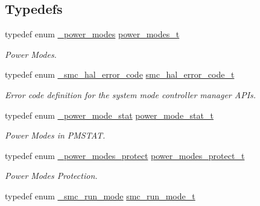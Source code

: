 \subsection*{Typedefs}
\begin{DoxyCompactItemize}
\item 
typedef enum \hyperlink{group__smc__hal_gadd864c409720de3fed5b226fa10e0b2d}{\+\_\+power\+\_\+modes} \hyperlink{group__smc__hal_gaabb544d3244b2616aba0a5dca3e18341}{power\+\_\+modes\+\_\+t}\hypertarget{group__smc__hal_gaabb544d3244b2616aba0a5dca3e18341}{}\label{group__smc__hal_gaabb544d3244b2616aba0a5dca3e18341}

\begin{DoxyCompactList}\small\item\em Power Modes. \end{DoxyCompactList}\item 
typedef enum \hyperlink{group__smc__hal_gaa517032576fb0e6693a224db2910fdda}{\+\_\+smc\+\_\+hal\+\_\+error\+\_\+code} \hyperlink{group__smc__hal_ga2b751667d499e320a58e84ac74abad59}{smc\+\_\+hal\+\_\+error\+\_\+code\+\_\+t}\hypertarget{group__smc__hal_ga2b751667d499e320a58e84ac74abad59}{}\label{group__smc__hal_ga2b751667d499e320a58e84ac74abad59}

\begin{DoxyCompactList}\small\item\em Error code definition for the system mode controller manager A\+P\+Is. \end{DoxyCompactList}\item 
typedef enum \hyperlink{group__smc__hal_ga50d35fdd2a2912b96e155d3f0dd395a4}{\+\_\+power\+\_\+mode\+\_\+stat} \hyperlink{group__smc__hal_ga6a75e966ec5d87b8c6a81d89eca06196}{power\+\_\+mode\+\_\+stat\+\_\+t}\hypertarget{group__smc__hal_ga6a75e966ec5d87b8c6a81d89eca06196}{}\label{group__smc__hal_ga6a75e966ec5d87b8c6a81d89eca06196}

\begin{DoxyCompactList}\small\item\em Power Modes in P\+M\+S\+T\+AT. \end{DoxyCompactList}\item 
typedef enum \hyperlink{group__smc__hal_ga1d6a886af480519a30236be3c73feab2}{\+\_\+power\+\_\+modes\+\_\+protect} \hyperlink{group__smc__hal_ga91e04aaf3e5d942ab1f3f6a65f4a5dd8}{power\+\_\+modes\+\_\+protect\+\_\+t}\hypertarget{group__smc__hal_ga91e04aaf3e5d942ab1f3f6a65f4a5dd8}{}\label{group__smc__hal_ga91e04aaf3e5d942ab1f3f6a65f4a5dd8}

\begin{DoxyCompactList}\small\item\em Power Modes Protection. \end{DoxyCompactList}\item 
typedef enum \hyperlink{group__smc__hal_gac2c182287ebbb6119d8bcbb6ead71e53}{\+\_\+smc\+\_\+run\+\_\+mode} \hyperlink{group__smc__hal_ga861334db15972df1faebfec3992bf211}{smc\+\_\+run\+\_\+mode\+\_\+t}\hypertarget{group__smc__hal_ga861334db15972df1faebfec3992bf211}{}\label{group__smc__hal_ga861334db15972df1faebfec3992bf211}


\end{DoxyCompactItemize}
